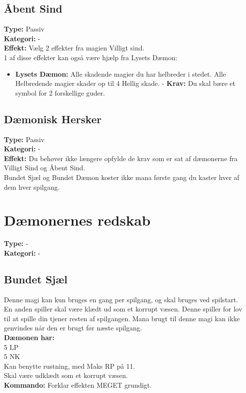 \subsection{Åbent Sind}
\textbf{Type:} Passiv\\
\textbf{Kategori:} -\\
\textbf{Effekt:} Vælg 2 effekter fra magien Villigt sind.\\
1 af disse effekter kan også være hjælp fra Lysets Dæmon:
\begin{itemize}
    \item \textbf{Lysets Dæmon:} Alle skadende magier du har helbreder i stedet. Alle Helbredende magier skader op til 4 Hellig skade. - \textbf{Krav:} Du skal bære et symbol for 2 forskellige guder.
\end{itemize}

\subsection{Dæmonisk Hersker}
\textbf{Type:} Passiv\\
\textbf{Kategori:} -\\
\textbf{Effekt:} Du behøver ikke længere opfylde de krav som er sat af dæmonerne fra Villigt Sind og Åbent Sind.\\
Bundet Sjæl og Bundet Dæmon koster ikke mana første gang du kaster hver af dem hver spilgang.

\section{Dæmonernes redskab}
\textbf{Type:} -\\
\textbf{Kategori:} -\\

\subsection{Bundet Sjæl}
Denne magi kan kun bruges en gang per spilgang, og skal bruges ved spilstart. En anden spiller skal være klædt ud som et korrupt væsen. Denne spiller for lov til at spille din tjener resten af spilgangen. Mana brugt til denne magi kan ikke genvindes når den er brugt før næste spilgang.\\
\textbf{Dæmonen har:}\\
5 LP\\ 
5 NK\\
Kan benytte rustning, med Maks RP på 11.\\
Skal være udklædt som et korrupt væsen.\\
\textbf{Kommando:} Forklar effekten MEGET grundigt.

